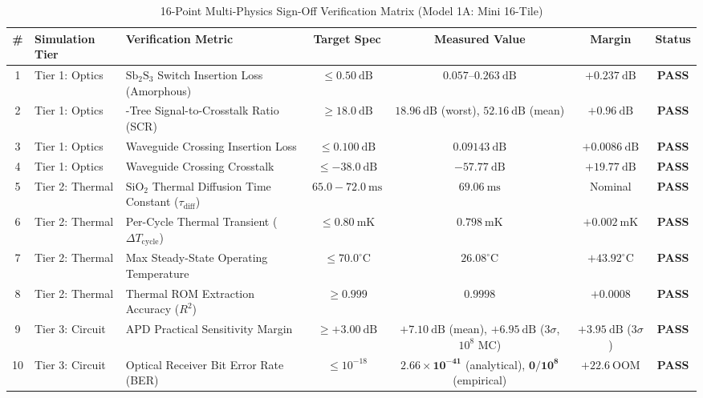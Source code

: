 \documentclass[journal]{IEEEtran}
\begin{document}
\begin{table}[!htbp]
\centering
\footnotesize
\setlength{\tabcolsep}{3.5pt}
\caption{16-Point Multi-Physics Sign-Off Verification Matrix (Model 1A: Mini 16-Tile)}
\label{tab:signoff_matrix}
\begin{tabularx}{\textwidth}{c l >{\raggedright\arraybackslash}X c c c c}
\toprule
\textbf{\#} & \textbf{Simulation Tier} & \textbf{Verification Metric} & \textbf{Target Spec} & \textbf{Measured Value} & \textbf{Margin} & \textbf{Status} \\
\midrule
1 & Tier 1: Optics & $\mathrm{Sb_2S_3}$ Switch Insertion Loss (Amorphous) & $\le 0.50~\mathrm{dB}$ & $\mathbf{0.057\text{--}0.263~\mathrm{dB}}$ & $+0.237~\mathrm{dB}$ & \textbf{PASS} \\
2 & Tier 1: Optics & 16-Tree Signal-to-Crosstalk Ratio (SCR) & $\ge 18.0~\mathrm{dB}$ & $\mathbf{18.96~\mathrm{dB}}$ (worst), $52.16~\mathrm{dB}$ (mean) & $+0.96~\mathrm{dB}$ & \textbf{PASS} \\
3 & Tier 1: Optics & Waveguide Crossing Insertion Loss & $\le 0.100~\mathrm{dB}$ & $\mathbf{0.09143~\mathrm{dB}}$ & $+0.0086~\mathrm{dB}$ & \textbf{PASS} \\
4 & Tier 1: Optics & Waveguide Crossing Crosstalk & $\le -38.0~\mathrm{dB}$ & $\mathbf{-57.77~\mathrm{dB}}$ & $+19.77~\mathrm{dB}$ & \textbf{PASS} \\
\midrule
5 & Tier 2: Thermal & $\mathrm{SiO_2}$ Thermal Diffusion Time Constant ($\tau_{\mathrm{diff}}$) & $65.0 - 72.0~\mathrm{ms}$ & $\mathbf{69.06~\mathrm{ms}}$ & Nominal & \textbf{PASS} \\
6 & Tier 2: Thermal & Per-Cycle Thermal Transient ($\Delta T_{\mathrm{cycle}}$) & $\le 0.80~\mathrm{mK}$ & $\mathbf{0.798~\mathrm{mK}}$ & $+0.002~\mathrm{mK}$ & \textbf{PASS} \\
7 & Tier 2: Thermal & Max Steady-State Operating Temperature & $\le 70.0^\circ\mathrm{C}$ & $\mathbf{26.08^\circ\mathrm{C}}$ & $+43.92^\circ\mathrm{C}$ & \textbf{PASS} \\
8 & Tier 2: Thermal & Thermal ROM Extraction Accuracy ($R^2$) & $\ge 0.999$ & $\mathbf{0.9998}$ & $+0.0008$ & \textbf{PASS} \\
\midrule
9 & Tier 3: Circuit & APD Practical Sensitivity Margin & $\ge +3.00~\mathrm{dB}$ & $\mathbf{+7.10~\mathrm{dB}}$ (mean), $\mathbf{+6.95~\mathrm{dB}}$ ($3\sigma$, $10^8$ MC) & $+3.95~\mathrm{dB}$ ($3\sigma$) & \textbf{PASS} \\
10 & Tier 3: Circuit & Optical Receiver Bit Error Rate (BER) & $\le 10^{-18}$ & $\mathbf{2.66 \times 10^{-41}}$ (analytical), $\mathbf{0 / 10^8}$ (empirical) & $+22.6~\mathrm{OOM}$ & \textbf{PASS} \\

\end{tabularx}
\end{table}
\end{document}
